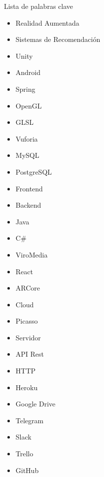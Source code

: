    Lista de palabras clave
   \begin{itemize}  
    \item Realidad Aumentada
    \item Sistemas de Recomendación
    \item Unity
    \item Android
    \item Spring
    \item OpenGL
    \item GLSL
    \item Vuforia
    \item MySQL
    \item PostgreSQL
    \item Frontend
    \item Backend
    \item Java
    \item C\#
    \item ViroMedia
    \item React
    \item ARCore
    \item Cloud
    \item Picasso
    \item Servidor
    \item API Rest
    \item HTTP
    \item Heroku
    \item Google Drive
    \item Telegram
    \item Slack
    \item Trello
    \item GitHub
  \end{itemize}
   


